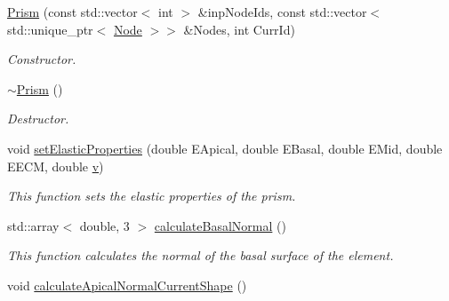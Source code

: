 \begin{DoxyCompactItemize}
\item 
\hypertarget{classPrism_a9dcd242eef25b663bd3d43554ca5aeb4}{}\hyperlink{classPrism_a9dcd242eef25b663bd3d43554ca5aeb4}{Prism} (const std\+::vector$<$ int $>$ \&inp\+Node\+Ids, const std\+::vector$<$ std\+::unique\+\_\+ptr$<$ \hyperlink{classNode}{Node} $>$$>$ \&Nodes, int Curr\+Id)\label{classPrism_a9dcd242eef25b663bd3d43554ca5aeb4}

\begin{DoxyCompactList}\small\item\em Constructor. \end{DoxyCompactList}\item 
\hypertarget{classPrism_a6ab0c30da5abd28ac1bea8530eb67ba5}{}\hyperlink{classPrism_a6ab0c30da5abd28ac1bea8530eb67ba5}{$\sim$\+Prism} ()\label{classPrism_a6ab0c30da5abd28ac1bea8530eb67ba5}

\begin{DoxyCompactList}\small\item\em Destructor. \end{DoxyCompactList}\item 
\hypertarget{classPrism_ac3f535b16518d1beea7d2405697bb203}{}void \hyperlink{classPrism_ac3f535b16518d1beea7d2405697bb203}{set\+Elastic\+Properties} (double E\+Apical, double E\+Basal, double E\+Mid, double E\+E\+C\+M, double \hyperlink{classShapeBase_a8b4c2d3bfbc6c9785c5181a56f929151}{v})\label{classPrism_ac3f535b16518d1beea7d2405697bb203}

\begin{DoxyCompactList}\small\item\em This function sets the elastic properties of the prism. \end{DoxyCompactList}\item 
\hypertarget{classPrism_a44a73ea508f443cbefc8e301d3f190ad}{}std\+::array$<$ double, 3 $>$ \hyperlink{classPrism_a44a73ea508f443cbefc8e301d3f190ad}{calculate\+Basal\+Normal} ()\label{classPrism_a44a73ea508f443cbefc8e301d3f190ad}

\begin{DoxyCompactList}\small\item\em This function calculates the normal of the basal surface of the element. \end{DoxyCompactList}\item 
\hypertarget{classPrism_a7fe4a2476246f2b4f8368b61584dea58}{}void \hyperlink{classPrism_a7fe4a2476246f2b4f8368b61584dea58}{calculate\+Apical\+Normal\+Current\+Shape} ()\label{classPrism_a7fe4a2476246f2b4f8368b61584dea58}


\end{DoxyCompactItemize}
